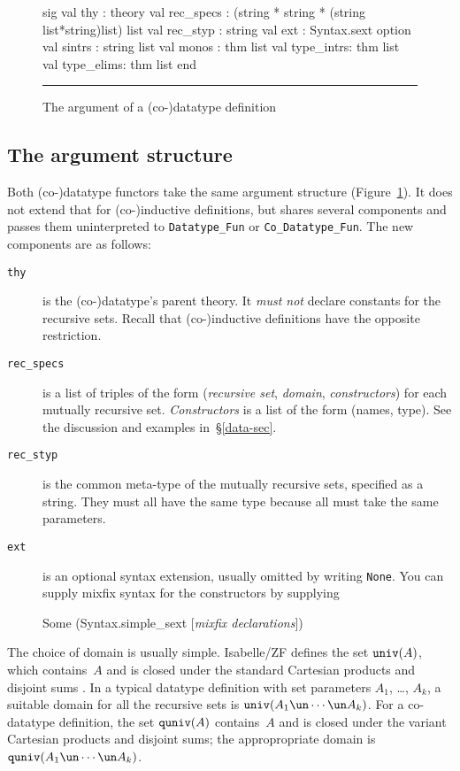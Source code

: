 \begin{figure}
\begin{ttbox}
sig
val thy       : theory
val rec_specs : (string * string * (string list*string)list) list
val rec_styp  : string
val ext       : Syntax.sext option
val sintrs    : string list
val monos     : thm list
val type_intrs: thm list
val type_elims: thm list
end
\end{ttbox}
\hrule
\caption{The argument of a (co-)datatype definition} \label{data-arg-fig}
\end{figure}

\subsection{The argument structure}
Both (co-)datatype functors take the same argument structure
(Figure~\ref{data-arg-fig}).  It does not extend that for (co-)inductive
definitions, but shares several components  and passes them uninterpreted to
\verb|Datatype_Fun| or
\verb|Co_Datatype_Fun|.  The new components are as follows:
\begin{description}
\item[\tt thy] is the (co-)datatype's parent theory. It {\it must not\/}
declare constants for the recursive sets.  Recall that (co-)inductive
definitions have the opposite restriction.

\item[\tt rec\_specs] is a list of triples of the form ({\it recursive set\/},
{\it domain\/}, {\it constructors\/}) for each mutually recursive set.  {\it
Constructors\/} is a list of the form (names, type).  See the discussion and
examples in~\S\ref{data-sec}.

\item[\tt rec\_styp] is the common meta-type of the mutually recursive sets,
specified as a string.  They must all have the same type because all must
take the same parameters.

\item[\tt ext] is an optional syntax extension, usually omitted by writing
{\tt None}.  You can supply mixfix syntax for the constructors by supplying
\begin{ttbox}
Some (Syntax.simple_sext [{\it mixfix declarations\/}])
\end{ttbox}
\end{description}
The choice of domain is usually simple.  Isabelle/ZF defines the set
${\tt univ}(A)$, which contains~$A$ and is closed under the standard Cartesian
products and disjoint sums \cite[\S4.2]{paulson-set-II}.  In a typical
datatype definition with set parameters $A_1$, \ldots, $A_k$, a suitable
domain for all the recursive sets is $\univ(A_1\un\cdots\un A_k)$.  For a
co-datatype definition, the set
${\tt quniv}(A)$ contains~$A$ and is closed under the variant Cartesian products
and disjoint sums; the appropropriate domain is
$\quniv(A_1\un\cdots\un A_k)$.

